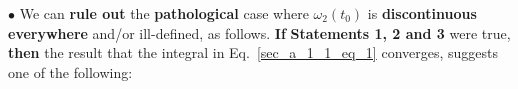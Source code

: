 \documentclass[11pt]{elsarticle}
\begin{document}





$\bullet$ We can \textbf{rule out} the \textbf{pathological }case where $\omega_2(t_0)$ is \textbf{discontinuous everywhere} and/or ill-defined, as follows. \textbf{If} \textbf{Statements 1, 2 and 3} were true, \textbf{then} the result that the integral in Eq.~\ref{sec_a_1_1_eq_1} converges, suggests one of the following: \\
\end{document}
